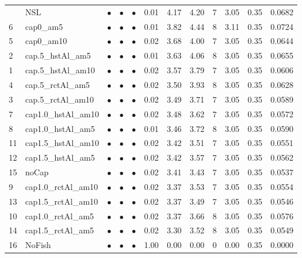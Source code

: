 \documentclass[11pt]{book}
\begin{document}
\begin{landscape}
\begin{longtable}[t]{llcccccccccc}
\midrule
\endhead
\
\endfoot
\bottomrule
\endlastfoot
17 & NSL & $\bullet$ & $\bullet$ & $\bullet$ & 0.01 & 4.17 & 4.20 & 7 & 3.05 & 0.35 & 0.0682\\
6 & cap0\_am5 & $\bullet$ & $\bullet$ & $\bullet$ & 0.01 & 3.82 & 4.44 & 8 & 3.11 & 0.35 & 0.0724\\
5 & cap0\_am10 & $\bullet$ & $\bullet$ & $\bullet$ & 0.02 & 3.68 & 4.00 & 7 & 3.05 & 0.35 & 0.0644\\
2 & cap.5\_hstAl\_am5 & $\bullet$ & $\bullet$ & $\bullet$ & 0.01 & 3.63 & 4.06 & 8 & 3.05 & 0.35 & 0.0655\\
1 & cap.5\_hstAl\_am10 & $\bullet$ & $\bullet$ & $\bullet$ & 0.02 & 3.57 & 3.79 & 7 & 3.05 & 0.35 & 0.0606\\
4 & cap.5\_rctAl\_am5 & $\bullet$ & $\bullet$ & $\bullet$ & 0.02 & 3.50 & 3.93 & 8 & 3.05 & 0.35 & 0.0628\\
3 & cap.5\_rctAl\_am10 & $\bullet$ & $\bullet$ & $\bullet$ & 0.02 & 3.49 & 3.71 & 7 & 3.05 & 0.35 & 0.0589\\
7 & cap1.0\_hstAl\_am10 & $\bullet$ & $\bullet$ & $\bullet$ & 0.02 & 3.48 & 3.62 & 7 & 3.05 & 0.35 & 0.0572\\
8 & cap1.0\_hstAl\_am5 & $\bullet$ & $\bullet$ & $\bullet$ & 0.01 & 3.46 & 3.72 & 8 & 3.05 & 0.35 & 0.0590\\
11 & cap1.5\_hstAl\_am10 & $\bullet$ & $\bullet$ & $\bullet$ & 0.02 & 3.42 & 3.51 & 7 & 3.05 & 0.35 & 0.0551\\
12 & cap1.5\_hstAl\_am5 & $\bullet$ & $\bullet$ & $\bullet$ & 0.02 & 3.42 & 3.57 & 7 & 3.05 & 0.35 & 0.0562\\
15 & noCap & $\bullet$ & $\bullet$ & $\bullet$ & 0.02 & 3.41 & 3.43 & 7 & 3.05 & 0.35 & 0.0537\\
9 & cap1.0\_rctAl\_am10 & $\bullet$ & $\bullet$ & $\bullet$ & 0.02 & 3.37 & 3.53 & 7 & 3.05 & 0.35 & 0.0554\\
13 & cap1.5\_rctAl\_am10 & $\bullet$ & $\bullet$ & $\bullet$ & 0.02 & 3.37 & 3.49 & 7 & 3.05 & 0.35 & 0.0546\\
10 & cap1.0\_rctAl\_am5 & $\bullet$ & $\bullet$ & $\bullet$ & 0.02 & 3.37 & 3.66 & 8 & 3.05 & 0.35 & 0.0576\\
14 & cap1.5\_rctAl\_am5 & $\bullet$ & $\bullet$ & $\bullet$ & 0.02 & 3.30 & 3.52 & 8 & 3.05 & 0.35 & 0.0549\\
16 & NoFish & $\bullet$ & $\bullet$ & $\bullet$ & 1.00 & 0.00 & 0.00 & 0 & 0.00 & 0.35 & 0.0000\\*
\end{longtable}
\endgroup{}
\end{landscape}
\endgroup{}
\end{document}
